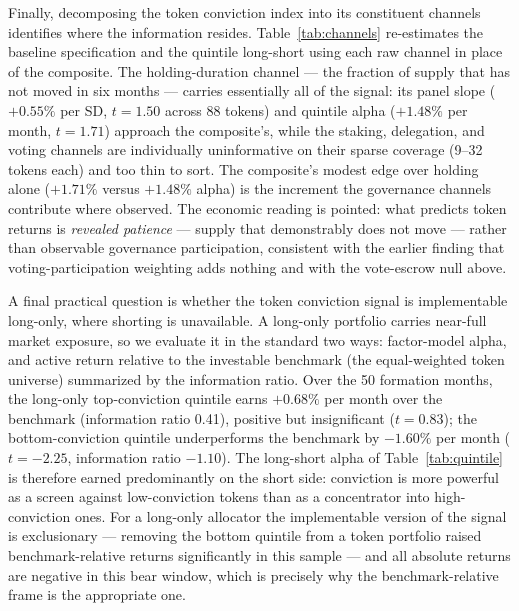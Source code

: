 \documentclass[12pt]{article}
\begin{document}
Finally, decomposing the token conviction index into its constituent channels
identifies where the information resides. Table~\ref{tab:channels} re-estimates the
baseline specification and the quintile long-short using each raw channel in place of
the composite. The holding-duration channel --- the fraction of supply that has not
moved in six months --- carries essentially all of the signal: its panel slope
($+0.55\%$ per SD, $t=1.50$ across 88 tokens) and quintile alpha ($+1.48\%$ per month,
$t=1.71$) approach the composite's, while the staking, delegation, and voting channels
are individually uninformative on their sparse coverage (9--32 tokens each) and too
thin to sort. The composite's modest edge over holding alone ($+1.71\%$ versus
$+1.48\%$ alpha) is the increment the governance channels contribute where observed.
The economic reading is pointed: what predicts token returns is \textit{revealed
patience} --- supply that demonstrably does not move --- rather than observable
governance participation, consistent with the earlier finding that
voting-participation weighting adds nothing and with the vote-escrow null above.

A final practical question is whether the token conviction signal is implementable
long-only, where shorting is unavailable. A long-only portfolio carries near-full
market exposure, so we evaluate it in the standard two ways: factor-model alpha, and
active return relative to the investable benchmark (the equal-weighted token universe)
summarized by the information ratio. Over the 50 formation months, the long-only
top-conviction quintile earns $+0.68\%$ per month over the benchmark (information
ratio 0.41), positive but insignificant ($t=0.83$); the bottom-conviction quintile
underperforms the benchmark by $-1.60\%$ per month ($t=-2.25$, information ratio
$-1.10$). The long-short alpha of Table~\ref{tab:quintile} is therefore earned
predominantly on the short side: conviction is more powerful as a screen against
low-conviction tokens than as a concentrator into high-conviction ones. For a
long-only allocator the implementable version of the signal is exclusionary ---
removing the bottom quintile from a token portfolio raised benchmark-relative returns
significantly in this sample --- and all absolute returns are negative in this bear
window, which is precisely why the benchmark-relative frame is the appropriate one.
\end{document}
